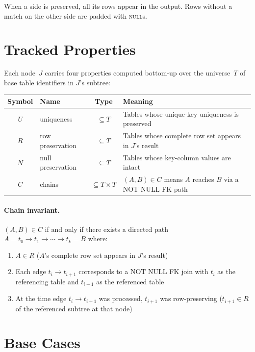 \documentclass[11pt]{article}
\theoremstyle{definition}
\begin{document}
When a side is preserved, all its rows appear in the output.  Rows
without a match on the other side are padded with \textsc{null}s.


\section{Tracked Properties}

Each node~$J$ carries four properties computed bottom-up over the
universe~$T$ of base table identifiers in $J$'s subtree:

\begin{center}
\begin{tabular}{clcl}
\toprule
Symbol & Name & Type & Meaning \\
\midrule
$U$ & uniqueness
    & $\subseteq T$
    & Tables whose unique-key uniqueness is preserved \\
$R$ & row preservation
    & $\subseteq T$
    & Tables whose complete row set appears in $J$'s result \\
$N$ & null preservation
    & $\subseteq T$
    & Tables whose key-column values are intact \\
$C$ & chains
    & $\subseteq T \times T$
    & $(A,B) \in C$ means $A$ reaches $B$ via a NOT NULL FK path \\
\bottomrule
\end{tabular}
\end{center}

\paragraph{Chain invariant.}
$(A, B) \in C$ if and only if there exists a directed path
$A = t_0 \to t_1 \to \cdots \to t_k = B$ where:
\begin{enumerate}
\item $A \in R$ \quad ($A$'s complete row set appears in $J$'s result)
\item Each edge $t_i \to t_{i+1}$ corresponds to a NOT NULL FK join
  with $t_i$ as the referencing table and $t_{i+1}$ as the referenced
  table
\item At the time edge $t_i \to t_{i+1}$ was processed, $t_{i+1}$
  was row-preserving ($t_{i+1} \in R$ of the referenced subtree at
  that node)
\end{enumerate}


\section{Base Cases}
\end{document}
